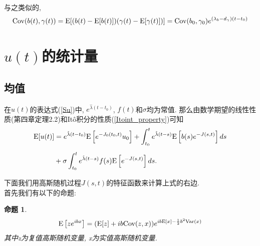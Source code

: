 \documentclass[notitlepage,cs4size,punct,oneside]{ctexrep}
\numberwithin{equation}{section}
\theoremstyle{mystyle}
\newtheorem{proposition}[definition]{\hspace{2em}命题}
\begin{document}
与之类似的,
\begin{equation} \label{b_gamma_Cov}
\text{Cov}(b(t), \gamma(t)) = \text{E}[(b(t) - \text{E}[b(t)])(\gamma(t)-\text{E}[\gamma(t)])]
= \text{Cov}(b_0, \gamma_0)e^{(\lambda_b-d_\gamma)(t-t_0)}
\end{equation}

\section{$u(t)$的统计量}
\subsection{均值}
在$u(t)$的表达式(\ref{Su})中, $e^{\hat{\lambda}(t-t_0)}$, $f(t)$和$\sigma$均为常值. 那么由数学期望的线性性质(\cite{shuyuanhe2006probability}第四章定理2.2)和It\^{o}积分的性质(\ref{Itoint_property})可知
\begin{equation} \label{u_stat_1}
\begin{split}
\text{E}[u(t)] &= e^{\hat{\lambda}(t-t_0)}\text{E}\left[e^{-J_0(t_0, t)}u_0\right] + \int_{t_0}^t e^{\hat{\lambda}(t-s)}\text{E}\left[b(s)e^{-J(s, t)}\right]ds  \\[5pt]
&+ \sigma\int_{t_0}^{t} e^{\hat{\lambda}(t-s)}f(s)\text{E}\left[e^{-J(s, t)}\right]ds.
\end{split}
\end{equation}

下面我们用高斯随机过程$J(s, t)$的特征函数\cite{gershgorin2008nonlinear}\cite{gershgorin2010filtering}来计算上式的右边. \\
首先我们有以下的命题:
\begin{proposition} \label{multiVariable gaussian exp 1}
$$\text{E}\left[ze^{ibx}\right] = (\text{E}[z]+ib\text{Cov}(z, x))e^{ib\text{E}[x]-\frac{1}{2}b^2\text{Var}(x)}$$
其中z为复值高斯随机变量, x为实值高斯随机变量. 
\end{proposition}
\end{document}

